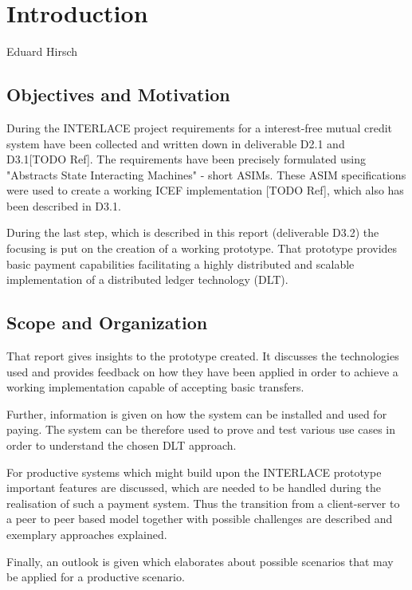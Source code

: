 \chapter{Introduction}
\label{ch:Introduction}

\vspace{-1cm}
\begin{center}
Eduard Hirsch
\end{center}


\section{Objectives and Motivation}

During the INTERLACE project requirements for a interest-free mutual credit system have been collected and written down in deliverable D2.1 and D3.1[TODO Ref]. The requirements have been precisely formulated using "Abstracts State Interacting Machines" - short ASIMs. These ASIM specifications were used to create a working ICEF implementation [TODO Ref], which also has been described in D3.1.

During the last step, which is described in this report (deliverable D3.2) the focusing is put on the creation of a working prototype. That prototype provides basic payment capabilities facilitating a highly distributed and scalable implementation of a distributed ledger technology (DLT).

\section{Scope and Organization}

That report gives insights to the prototype created. It discusses the technologies used and provides feedback on how they have been applied in order to achieve a working implementation capable of accepting basic transfers.

Further, information is given on how the system can be installed and used for paying. The system can be therefore used to prove and test various use cases in order to understand the chosen DLT approach.

For productive systems which might build upon the INTERLACE prototype important features are discussed, which are needed to be handled during the realisation of such a payment system. Thus the transition from a client-server to a peer to peer based model together with possible challenges are described and exemplary approaches explained.

Finally, an outlook is given which elaborates about possible scenarios that may be applied for a productive scenario.

\newpage

